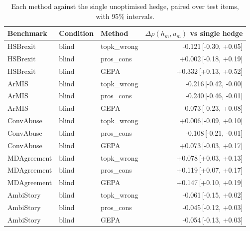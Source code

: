 \begin{table}[t]
\centering
\small
\begin{tabular}{lllr}
\hline
Benchmark & Condition & Method & $\Delta\rho(h_m,u_m)$ vs single hedge \\
\hline
HSBrexit & blind & topk\_wrong & -0.121{\scriptsize\,[-0.30, +0.05]} \\
HSBrexit & blind & pros\_cons & +0.002{\scriptsize\,[-0.18, +0.19]} \\
HSBrexit & blind & GEPA & +0.332{\scriptsize\,[+0.13, +0.52]} \\
ArMIS & blind & topk\_wrong & -0.216{\scriptsize\,[-0.42, -0.00]} \\
ArMIS & blind & pros\_cons & -0.240{\scriptsize\,[-0.46, -0.01]} \\
ArMIS & blind & GEPA & -0.073{\scriptsize\,[-0.23, +0.08]} \\
ConvAbuse & blind & topk\_wrong & +0.006{\scriptsize\,[-0.09, +0.10]} \\
ConvAbuse & blind & pros\_cons & -0.108{\scriptsize\,[-0.21, -0.01]} \\
ConvAbuse & blind & GEPA & +0.073{\scriptsize\,[-0.03, +0.17]} \\
MDAgreement & blind & topk\_wrong & +0.078{\scriptsize\,[+0.03, +0.13]} \\
MDAgreement & blind & pros\_cons & +0.119{\scriptsize\,[+0.07, +0.17]} \\
MDAgreement & blind & GEPA & +0.147{\scriptsize\,[+0.10, +0.19]} \\
AmbiStory & blind & topk\_wrong & -0.061{\scriptsize\,[-0.15, +0.02]} \\
AmbiStory & blind & pros\_cons & -0.045{\scriptsize\,[-0.12, +0.03]} \\
AmbiStory & blind & GEPA & -0.054{\scriptsize\,[-0.13, +0.03]} \\
\hline
\end{tabular}
\caption{Each method against the single unoptimised hedge, paired over test items, with 95\% intervals.}
\label{tab:paired-methods}
\end{table}